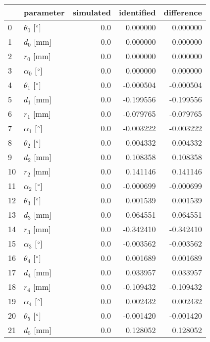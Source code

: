 \documentclass{standalone}%
\begin{document}
%
\normalsize%
\begin{tabular}{llrrr}
\toprule
{} &                 parameter & simulated & identified & difference \\
\midrule
0  &  $\theta_{0}$ [$\degree$] &       0.0 &   0.000000 &   0.000000 \\
1  &              $d_{0}$ [mm] &       0.0 &   0.000000 &   0.000000 \\
2  &              $r_{0}$ [mm] &       0.0 &   0.000000 &   0.000000 \\
3  &  $\alpha_{0}$ [$\degree$] &       0.0 &   0.000000 &   0.000000 \\
4  &  $\theta_{1}$ [$\degree$] &       0.0 &  -0.000504 &  -0.000504 \\
5  &              $d_{1}$ [mm] &       0.0 &  -0.199556 &  -0.199556 \\
6  &              $r_{1}$ [mm] &       0.0 &  -0.079765 &  -0.079765 \\
7  &  $\alpha_{1}$ [$\degree$] &       0.0 &  -0.003222 &  -0.003222 \\
8  &  $\theta_{2}$ [$\degree$] &       0.0 &   0.004332 &   0.004332 \\
9  &              $d_{2}$ [mm] &       0.0 &   0.108358 &   0.108358 \\
10 &              $r_{2}$ [mm] &       0.0 &   0.141146 &   0.141146 \\
11 &  $\alpha_{2}$ [$\degree$] &       0.0 &  -0.000699 &  -0.000699 \\
12 &  $\theta_{3}$ [$\degree$] &       0.0 &   0.001539 &   0.001539 \\
13 &              $d_{3}$ [mm] &       0.0 &   0.064551 &   0.064551 \\
14 &              $r_{3}$ [mm] &       0.0 &  -0.342410 &  -0.342410 \\
15 &  $\alpha_{3}$ [$\degree$] &       0.0 &  -0.003562 &  -0.003562 \\
16 &  $\theta_{4}$ [$\degree$] &       0.0 &   0.001689 &   0.001689 \\
17 &              $d_{4}$ [mm] &       0.0 &   0.033957 &   0.033957 \\
18 &              $r_{4}$ [mm] &       0.0 &  -0.109432 &  -0.109432 \\
19 &  $\alpha_{4}$ [$\degree$] &       0.0 &   0.002432 &   0.002432 \\
20 &  $\theta_{5}$ [$\degree$] &       0.0 &  -0.001420 &  -0.001420 \\
21 &              $d_{5}$ [mm] &       0.0 &   0.128052 &   0.128052 \\

\end{tabular}
\end{document}
